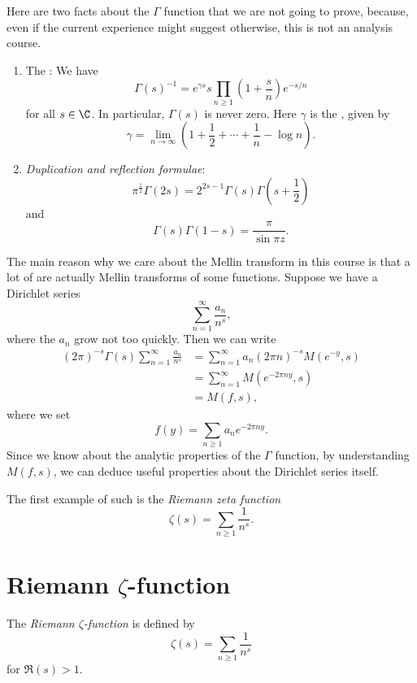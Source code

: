 \documentclass[a4paper]{article}
\begin{document}
Here are two facts about the $\Gamma$ function that we are not going to prove, because, even if the current experience might suggest otherwise, this is not an analysis course.
\begin{prop}\leavevmode
  \begin{enumerate}
    \item The : We have
      \[
        \Gamma(s)^{-1} = e^{\gamma s} s \prod_{n \geq 1} \left(1 + \frac{s}{n}\right) e^{-s/n}
      \]
      for all $s \in \C$. In particular, $\Gamma(s)$ is never zero. Here $\gamma$ is the , given by
      \[
        \gamma = \lim_{n \to \infty}\left(1 + \frac{1}{2} + \cdots + \frac{1}{n} - \log n\right).
      \]
    \item \emph{Duplication and reflection formulae}:
      \[
        \pi^{\frac{1}{2}} \Gamma(2s) = 2^{2s - 1} \Gamma(s) \Gamma\left(s + \frac{1}{2}\right)
      \]
      and
      \[
        \Gamma(s) \Gamma(1 - s) = \frac{\pi}{\sin \pi z}.
      \]
  \end{enumerate}
\end{prop}

The main reason why we care about the Mellin transform in this course is that a lot of  are actually Mellin transforms of some functions. Suppose we have a Dirichlet series
\[
  \sum_{n = 1}^\infty \frac{a_n}{n^s},
\]
where the $a_n$ grow not too quickly. Then we can write
\begin{align*}
  (2\pi)^{-s} \Gamma(s)\sum_{n = 1}^\infty \frac{a_n}{n^s} &= \sum_{n = 1}^\infty a_n (2\pi n)^{-s} M(e^{-y}, s)\\
  &= \sum_{n = 1}^\infty M(e^{-2 \pi n y}, s) \\
  &= M(f, s),
\end{align*}
where we set
\[
  f(y) = \sum_{n \geq 1} a_n e^{-2\pi n y}.
\]
Since we know about the analytic properties of the $\Gamma$ function, by understanding $M(f, s)$, we can deduce useful properties about the Dirichlet series itself.

The first example of such is the \emph{Riemann zeta function}
\[
  \zeta(s) = \sum_{n \geq 1} \frac{1}{n^s}.
\]

\section{Riemann \texorpdfstring{$\zeta$}{zeta}-function}
\begin{defi}
  The \emph{Riemann $\zeta$-function} is defined by
  \[
    \zeta(s) = \sum_{n \geq 1} \frac{1}{n^s}
  \]
  for $\Re(s) > 1$.
\end{defi}
\end{document}
